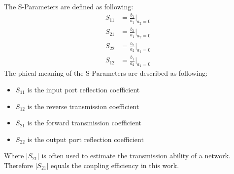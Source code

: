 The S-Parameters are defined as following:
\begin{align*}
S_{11}&=\frac{b_{1}}{a_{1}}|_{a_{2}=0}\\
S_{21}&=\frac{b_{2}}{a_{1}}|_{a_{2}=0}\\
S_{22}&=\frac{b_{2}}{a_{2}}|_{a_{1}=0}\\
S_{12}&=\frac{b_{1}}{a_{2}}|_{a_{1}=0}
\end{align*}
The phical meaning of the S-Parameters are described as following:
\begin{itemize}
\item $S_{11}$ is the input port reflection coefficient
\item $S_{12}$ is the reverse transmission coefficient
\item $S_{21}$ is the forward transmission coefficient
\item $S_{22}$ is the output port reflection coefficient
\end{itemize}
Where $|S_{21}|$ is often used to estimate the transmission ability of a network. Therefore $|S_{21}|$ equals the coupling efficiency in this work.
